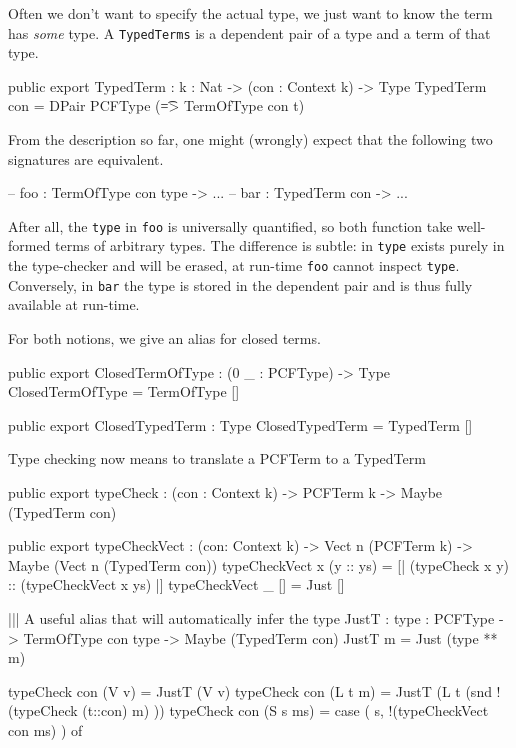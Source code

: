 Often we don't want to specify the actual type, we just want to know the term has \emph{some} type.
A \texttt{TypedTerms} is a dependent pair of a type and a term of that type.
\begin{code}
public export
TypedTerm : {k : Nat} -> (con : Context k) -> Type
TypedTerm con = DPair PCFType (\t => TermOfType con t)
\end{code}

From the description so far, one might (wrongly) expect that the following two signatures are equivalent.
\begin{code}
-- foo : TermOfType con type -> ...
-- bar : TypedTerm con    -> ...
\end{code}
After all, the \texttt{type} in \texttt{foo} is universally quantified, so both function take well-formed terms of arbitrary types.
The difference is subtle: in \texttt{type} exists purely in the type-checker and will be erased, at run-time \texttt{foo} cannot inspect \texttt{type}. Conversely, in \texttt{bar} the type is stored in the dependent pair and is thus fully available at run-time.


For both notions, we give an alias for closed terms.

\begin{code}
public export
ClosedTermOfType : (0 _ : PCFType) -> Type
ClosedTermOfType = TermOfType []

public export
ClosedTypedTerm : Type
ClosedTypedTerm = TypedTerm []
\end{code}

Type checking now means to translate a PCFTerm to a TypedTerm

\begin{code}
public export
typeCheck : (con : Context k) -> PCFTerm k -> Maybe (TypedTerm con)

public export
typeCheckVect : (con: Context k) -> Vect n (PCFTerm k) -> Maybe (Vect n (TypedTerm con))
typeCheckVect x (y :: ys) = [| (typeCheck x y) :: (typeCheckVect x ys) |]
typeCheckVect _ []        = Just []

||| A useful alias that will automatically infer the type
JustT : {type : PCFType} -> TermOfType con type -> Maybe (TypedTerm con)
JustT m = Just (type ** m)

typeCheck con (V v)    = JustT (V v) 
typeCheck con (L t m)  = JustT (L t (snd !(typeCheck (t::con) m) ))
typeCheck con (S s ms) = case ( s,  !(typeCheckVect con ms) ) of
\end{code}

